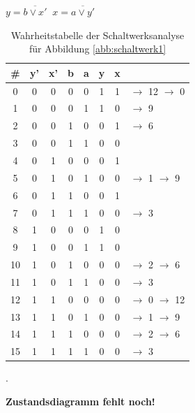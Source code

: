 \documentclass[10pt,a4paper]{scrartcl}
\newcommand{\cmark}{\textcolor{green!80!black}{\ding{51}}}%
\newcommand{\xmark}{\textcolor{red}{\ding{55}}}%
\begin{document}
\begin{table}[h!]
	\centering
	$y = \overline{b \vee x'} \;\; x = \overline{a \vee y'}$
	\\[1em]
	\begin{tabular}{c|cc|cc|cc|l}
		\# & y'  & x'  & b & a & y & x & \\ \hline
		0 & 0 & 0 & 0 & 0 & 1 & 1 & \xmark $\rightarrow$ 12 $\rightarrow$ 0 \textcolor{red}{\lightning}\\
		1 & 0 & 0 & 0 & 1 & 1 & 0 & \xmark $\rightarrow$ 9 \cmark \\
		2 & 0 & 0 & 1 & 0 & 0 & 1 & \xmark $\rightarrow$ 6 \cmark\\
		3 & 0 & 0 & 1 & 1 & 0 & 0 & \cmark \\ \cline{2-3}
		4 & 0 & 1 & 0 & 0 & 0 & 1 & \cmark\\
		5 & 0 & 1 & 0 & 1 & 0 & 0 & \xmark $\rightarrow$ 1 $\rightarrow$ 9 \cmark\\
		6 & 0 & 1 & 1 & 0 & 0 & 1 & \cmark\\
		7 & 0 & 1 & 1 & 1 & 0 & 0 & \xmark $\rightarrow$ 3 \cmark\\ \cline{2-3}
		8 & 1 & 0 & 0 & 0 & 1 & 0 & \cmark\\
		9 & 1 & 0 & 0 & 1 & 1 & 0 & \cmark\\
		10 & 1 & 0 & 1 & 0 & 0 & 0 & \xmark $\rightarrow$ 2 $\rightarrow$ 6 \cmark\\
		11 & 1 & 0 & 1 & 1 & 0 & 0 & \xmark $\rightarrow$ 3 \cmark\\ \cline{2-3}
		12 & 1 & 1 & 0 & 0 & 0 & 0 & \xmark $\rightarrow$ 0 $\rightarrow$ 12 \textcolor{red}{\lightning}\\
		13 & 1 & 1 & 0 & 1 & 0 & 0 & \xmark $\rightarrow$ 1 $\rightarrow$ 9 \cmark\\
		14 & 1 & 1 & 1 & 0 & 0 & 0 & \xmark $\rightarrow$ 2 $\rightarrow$ 6 \cmark\\
		15 & 1 & 1 & 1 & 1 & 0 & 0 & \xmark $\rightarrow$ 3 \cmark\\
	\end{tabular}
\caption{Wahrheitstabelle der Schaltwerksanalyse für Abbildung \ref{abb:schaltwerk1}}.
\end{table}

\textbf{Zustandsdiagramm fehlt noch!}\\
\end{document}

